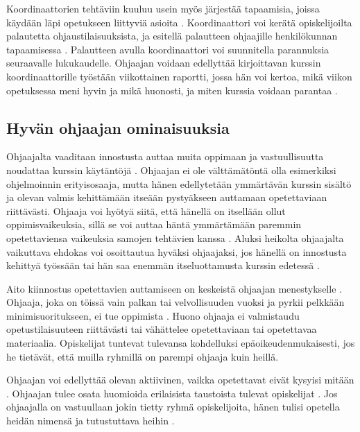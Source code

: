 \documentclass[finnish]{tktltiki2}
\theoremstyle{definition}
\theoremstyle{remark}
\begin{document}
Koordinaattorien tehtäviin kuuluu usein myös järjestää tapaamisia, joissa käydään läpi opetukseen liittyviä asioita \cite{Reges88, Roberts95}. Koordinaattori voi kerätä opiskelijoilta palautetta ohjaustilaisuuksista, ja esitellä palautteen ohjaajille henkilökunnan tapaamisessa \cite{Patitsas12_2}. Palautteen avulla koordinaattori voi suunnitella parannuksia seuraavalle lukukaudelle. Ohjaajan voidaan edellyttää kirjoittavan kurssin koordinaattorille työstään viikottainen raportti, jossa hän voi kertoa, mikä viikon opetuksessa meni hyvin ja mikä huonosti, ja miten kurssia voidaan parantaa \cite{Hug11}. \par


\subsection{Hyvän ohjaajan ominaisuuksia}
Ohjaajalta vaaditaan innostusta auttaa muita oppimaan ja vastuullisuutta noudattaa kurssin käytäntöjä \cite{Reges88}. Ohjaajan ei ole välttämätöntä olla esimerkiksi ohjelmoinnin erityisosaaja, mutta hänen edellytetään ymmärtävän kurssin sisältö ja olevan valmis kehittämään itseään pystyäkseen auttamaan opetettaviaan riittävästi. Ohjaaja voi hyötyä siitä, että hänellä on itsellään ollut oppimisvaikeuksia, sillä se voi auttaa häntä ymmärtämään paremmin opetettaviensa vaikeuksia samojen tehtävien kanssa \cite{Decker06}.  Aluksi heikolta ohjaajalta vaikuttava ehdokas voi osoittautua hyväksi ohjaajaksi, jos hänellä on innostusta kehittyä työssään tai hän saa enemmän itseluottamusta kurssin edetessä \cite{Dickson11}. \par

Aito kiinnostus opetettavien auttamiseen on keskeistä ohjaajan menestykselle \cite{Richards00}. Ohjaaja, joka on töissä vain palkan tai velvollisuuden vuoksi ja pyrkii pelkkään minimisuoritukseen, ei tue oppimista \cite{Richards00}. Huono ohjaaja ei valmistaudu opetustilaisuuteen riittävästi tai vähättelee opetettaviaan tai opetettavaa materiaalia. Opiskelijat tuntevat tulevansa kohdelluksi epäoikeudenmukaisesti, jos he tietävät, että muilla ryhmillä on parempi ohjaaja kuin heillä. \par

Ohjaajan voi edellyttää olevan aktiivinen, vaikka opetettavat eivät kysyisi mitään \cite{Vikberg}. Ohjaajan tulee osata huomioida erilaisista taustoista tulevat opiskelijat \cite{Kay98}. Jos ohjaajalla on vastuullaan jokin tietty ryhmä opiskelijoita, hänen tulisi opetella heidän nimensä ja tutustuttava heihin \cite{Bernstein}. \par
\end{document}
